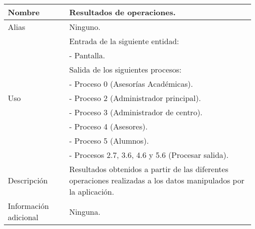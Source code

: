 \begin{center}
  \begin{tabular}{| l | p{9cm} |}
    \hline
    Nombre & \textbf{Resultados de operaciones}.\\
    \hline
    Alias & Ninguno.\\
    \hline
    \multirow{9}{*}{Uso} & Entrada de la siguiente entidad:\\
                         & - Pantalla.\\
                         & Salida de los siguientes procesos:\\
                         & - Proceso 0 (Asesorías Académicas).\\
                         & - Proceso 2 (Administrador principal).\\
                         & - Proceso 3 (Administrador de centro).\\
                         & - Proceso 4 (Asesores).\\
                         & - Proceso 5 (Alumnos).\\
                         & - Procesos 2.7, 3.6, 4.6 y 5.6 (Procesar salida).\\
    \hline
    Descripción & Resultados obtenidos a partir de las diferentes operaciones
                  realizadas a los datos manipulados por la aplicación.\\
    \hline
    Información adicional & Ninguna.\\
    \hline
  \end{tabular}
\end{center}
